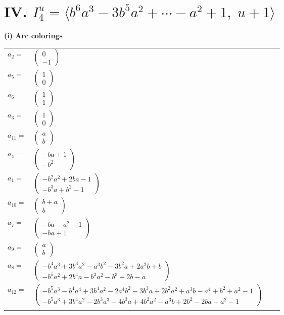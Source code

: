 \documentclass[1p]{elsarticle_modified}
\theoremstyle{definition}
\begin{document}
\centering \section*{IV. $I^u_{4}= \langle b^6 a^3-3 b^5 a^2+\cdots- a^2+1,\;u+1 \rangle$}
\flushleft \textbf{(i) Arc colorings}\\
\begin{tabular}{m{7pt} m{180pt} m{7pt} m{180pt} }
\flushright $a_{2}=$&$\begin{pmatrix}0\\-1\end{pmatrix}$ \\
\flushright $a_{5}=$&$\begin{pmatrix}1\\0\end{pmatrix}$ \\
\flushright $a_{6}=$&$\begin{pmatrix}1\\1\end{pmatrix}$ \\
\flushright $a_{3}=$&$\begin{pmatrix}1\\0\end{pmatrix}$ \\
\flushright $a_{11}=$&$\begin{pmatrix}a\\b\end{pmatrix}$ \\
\flushright $a_{4}=$&$\begin{pmatrix}- b a+1\\- b^2\end{pmatrix}$ \\
\flushright $a_{1}=$&$\begin{pmatrix}- b^2 a^2+2 b a-1\\- b^3 a+b^2-1\end{pmatrix}$ \\
\flushright $a_{10}=$&$\begin{pmatrix}b+a\\b\end{pmatrix}$ \\
\flushright $a_{7}=$&$\begin{pmatrix}- b a- a^2+1\\- b a+1\end{pmatrix}$ \\
\flushright $a_{9}=$&$\begin{pmatrix}a\\b\end{pmatrix}$ \\
\flushright $a_{8}=$&$\begin{pmatrix}- b^4 a^3+3 b^3 a^2- a^3 b^2-3 b^2 a+2 a^2 b+b\\- b^5 a^2+2 b^4 a- b^3 a^2- b^3+2 b- a\end{pmatrix}$ \\
\flushright $a_{12}=$&$\begin{pmatrix}- b^5 a^3- b^4 a^4+3 b^4 a^2-2 a^4 b^2-3 b^3 a+2 b^2 a^2+a^3 b- a^4+b^2+a^2-1\\- b^5 a^3+3 b^4 a^2-2 b^3 a^3-4 b^3 a+4 b^2 a^2- a^3 b+2 b^2-2 b a+a^2-1\end{pmatrix}$\\&\end{tabular}
\end{document}
